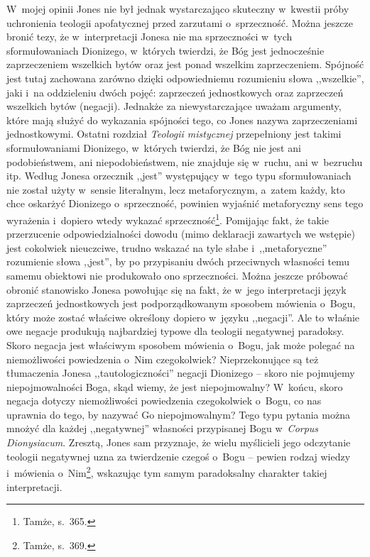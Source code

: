 W~mojej opinii Jones nie był jednak wystarczająco skuteczny w~kwestii próby uchronienia teologii apofatycznej przed zarzutami o~sprzeczność. Można jeszcze bronić tezy, że w~interpretacji Jonesa nie ma sprzeczności w~tych sformułowaniach Dionizego, w~których twierdzi, że Bóg jest jednocześnie zaprzeczeniem wszelkich bytów oraz jest ponad wszelkim zaprzeczeniem. Spójność jest tutaj zachowana zarówno dzięki odpowiedniemu rozumieniu słowa ,,wszelkie'', jaki i~na oddzieleniu dwóch pojęć: zaprzeczeń jednostkowych oraz zaprzeczeń wszelkich bytów (negacji). Jednakże za niewystarczające uważam argumenty, które mają służyć do wykazania spójności tego, co Jones nazywa zaprzeczeniami jednostkowymi. Ostatni rozdział \textit{Teologii mistycznej} przepełniony jest takimi sformułowaniami Dionizego, w~których twierdzi, że Bóg nie jest ani podobieństwem, ani niepodobieństwem, nie znajduje się w~ruchu, ani w~bezruchu itp. Według Jonesa orzecznik ,,jest'' występujący w~tego typu sformułowaniach nie został użyty w~sensie literalnym, lecz metaforycznym, a~zatem każdy, kto chce oskarżyć Dionizego o~sprzeczność, powinien wyjaśnić metaforyczny sens tego wyrażenia i~dopiero wtedy wykazać sprzeczność\footnote{Tamże, s.~365.}. Pomijając fakt, że takie przerzucenie odpowiedzialności dowodu (mimo deklaracji zawartych we wstępie) jest cokolwiek nieuczciwe, trudno wskazać na tyle słabe i~,,metaforyczne'' rozumienie słowa ,,jest'', by po przypisaniu dwóch przeciwnych własności temu samemu obiektowi nie produkowało ono sprzeczności. Można jeszcze próbować obronić stanowisko Jonesa powołując się na fakt, że w~jego interpretacji język zaprzeczeń jednostkowych jest podporządkowanym sposobem mówienia o~Bogu, który może zostać właściwe określony dopiero w~języku ,,negacji''. Ale to właśnie owe negacje produkują najbardziej typowe dla teologii negatywnej paradoksy. Skoro negacja jest właściwym sposobem mówienia o~Bogu, jak może polegać na niemożliwości powiedzenia o~Nim czegokolwiek? Nieprzekonujące są też tłumaczenia Jonesa ,,tautologiczności'' negacji Dionizego -- skoro nie pojmujemy niepojmowalności Boga, skąd wiemy, że jest niepojmowalny? W~końcu, skoro negacja dotyczy niemożliwości powiedzenia czegokolwiek o~Bogu, co nas uprawnia do tego, by nazywać Go niepojmowalnym? Tego typu pytania można mnożyć dla każdej ,,negatywnej'' własności przypisanej Bogu w~\textit{Corpus Dionysiacum}. Zresztą, Jones sam przyznaje, że wielu myślicieli jego odczytanie teologii negatywnej uzna za twierdzenie czegoś o~Bogu -- pewien rodzaj wiedzy i~mówienia o~Nim\footnote{Tamże, s.~369.}, wskazując tym samym paradoksalny charakter takiej interpretacji.

